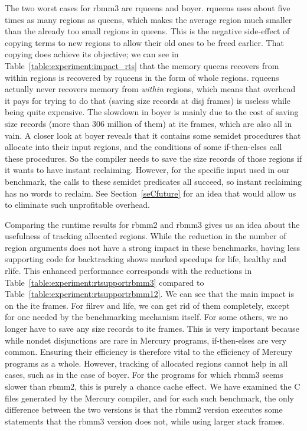 \documentclass{tlp}
\newcommand{\bench}[1]{{#1}}
\begin{document}
The two worst cases for rbmm3 are \bench{rqueens} and \bench{boyer}.
\bench{rqueens} uses about five times as many regions as \bench{queens},
which makes the average region much smaller
than the already too small regions in \bench{queens}.
This is the negative side-effect of copying terms to new regions
to allow their old ones to be freed earlier.
That copying does achieve its objective;
we can see in Table~\ref{table:experiment:impact_rts}
that the memory \bench{queens} recovers from within regions
is recovered by \bench{rqueens} in the form of whole regions.
\bench{rqueens} actually never recovers memory from \emph{within} regions,
which means that overhead it pays for trying to do that
(saving size records at disj frames)
is useless while being quite expensive.
The slowdown in \bench{boyer} is mainly due to
the cost of saving size records (more than 306 million of them) at ite frames,
which are also all in vain.
A closer look at \bench{boyer} reveals that
it contains some semidet procedures that allocate into their input regions,
and the conditions of some if-then-elses call these procedures.
So the compiler needs to save the size records of those regions
if it wants to have instant reclaiming.
However, for the specific input used in our benchmark,
the calls to these semidet predicates all succeed,
so instant reclaiming has no words to reclaim.
See Section~\ref{seCfuture} for an idea
that would allow us to eliminate such unprofitable overhead.

Comparing the runtime results for rbmm2 and rbmm3
gives us an idea about the usefulness of tracking allocated regions.
While the reduction in the number of region arguments
does not have a strong impact in these benchmarks,
having less supporting code for backtracking
shows marked speedups for \bench{life}, \bench{healthy} and \bench{rlife}.
This enhanced performance corresponds with the reductions in
Table~\ref{table:experiment:rtsupportrbmm3} compared to
Table~\ref{table:experiment:rtsupportrbmm12}.
We can see that the main impact is on the ite frames.
For \bench{filrev} and \bench{life}, we can get rid of them completely,
except for one needed by the benchmarking mechanism itself.
For some others, we no longer have to save any size records to ite frames.
This is very important because
while nondet disjunctions are rare in Mercury programs,
if-then-elses are very common.
Ensuring their efficiency is therefore vital
to the efficiency of Mercury programs as a whole.
However, tracking of allocated regions cannot help in all cases,
such as in the case of \bench{boyer}.
For the programs for which rbmm3 seems slower than rbmm2,
this is purely a chance cache effect.
We have examined the C files generated by the Mercury compiler,
and for each such benchmark,
the only difference between the two versions is that
the rbmm2 version executes some statements that the rbmm3 version does not,
while using larger stack frames.
\end{document}
